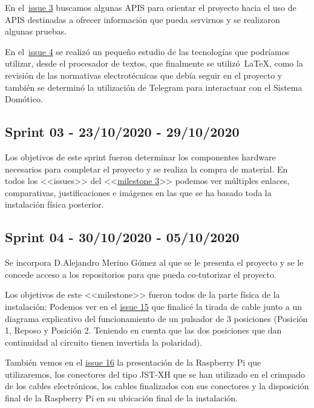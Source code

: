 En el~\href{https://github.com/davidelinformatico/TFG/issues/3}{issue 3} buscamos algunas APIS para orientar el proyecto hacia el uso de APIS destinadas a ofrecer información que pueda servirnos y se realizaron algunas pruebas.

En el~\href{https://github.com/davidelinformatico/TFG/issues/4}{issue 4} se realizó un pequeño estudio de las tecnologías que podríamos utilizar, desde el procesador de textos, que finalmente se utilizó~\LaTeX{}, como la revisión de las normativas electrotécnicas que debía seguir en el proyecto y también se determinó la utilización de Telegram para interactuar con el Sistema Domótico.

\subsection{Sprint 03 - 23/10/2020 - 29/10/2020}
Los objetivos de este sprint fueron determinar los componentes hardware necesarios para completar el proyecto y se realiza la compra de material.
En todos los <<issues>> del <<\href{https://github.com/davidelinformatico/TFG/milestone/3?closed=1}{milestone 3}>> podemos ver múltiples enlaces, comparativas, justificaciones e imágenes en las que se ha basado toda la instalación física posterior.

\subsection{Sprint 04 - 30/10/2020 - 05/10/2020}
Se incorpora D.Alejandro Merino Gómez al que se le presenta el proyecto y se le concede acceso a los repositorios para que pueda co-tutorizar el proyecto.

Los objetivos de este <<milestone>> fueron todos de la parte física de la instalación:
Podemos ver en el \href{https://github.com/davidelinformatico/TFG/issues/15}{issue 15} que finalicé la tirada de cable junto a un diagrama explicativo del funcionamiento de un pulsador de 3 posiciones (Posición 1, Reposo y Posición 2. Teniendo en cuenta que las dos posiciones que dan continuidad al circuito tienen invertida la polaridad).

También vemos en el \href{https://github.com/davidelinformatico/TFG/issues/16}{issue 16} la presentación de la Raspberry Pi que utilizaremos, los conectores del tipo JST-XH que se han utilizado en el crimpado de los cables electrónicos, los cables finalizados con sus conectores y la disposición final de la Raspberry Pi en su ubicación final de la instalación.

